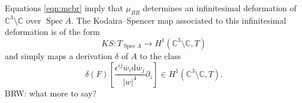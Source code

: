 \documentclass[11pt]{amsart}
\newcommand{\del}{\partial}
\newcommand{\eps}{\epsilon}
\newcommand{\br}{\overline}
\newcommand{\CC}{\mathbb C}
\newcommand{\norm}[1]{\left\| #1 \right\|}
\renewcommand{\d}{\mathrm{d}}
\def\eps{{\epsilon}}
\DeclareMathOperator{\Spec}{Spec}
\def\brian#1{{\textcolor{blue!65!red}{BRW: {#1}}}}
\def\beqn{\begin{equation}}
\def\eeqn{\end{equation}}
\theoremstyle{thm}
\numberwithin{equation}{subsection}
\theoremstyle{def}
\theoremstyle{rem}
\begin{document}
Equations \eqref{eqn:mcbr} imply that $\mu_{BR}$ determines an infinitesimal deformation of~$\CC^3 \setminus \CC$ over $\Spec A$. 
The Kodaira--Spencer map associated to this infinitesimal deformation is of the form
\[
KS \colon T_{\Spec A} \to H^1(\CC^3 \setminus \CC, T) 
\]
and simply maps a derivation $\delta$ of $A$ to the class 
\[
\delta(F) \left[\frac{\eps^{ij} \br w_i \d \br w_j}{|w|^4} \del_z \right] \in H^1(\CC^3 \setminus \CC, T) .
\] 
\brian{what more to say?}
%
%
\end{document}

